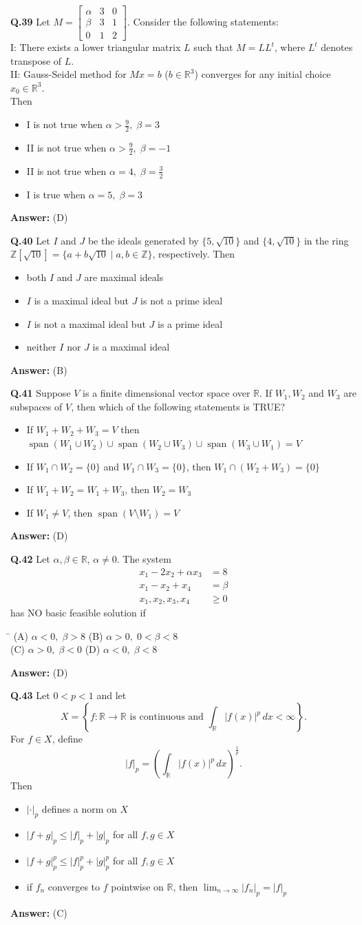 \documentclass[11pt,a4paper]{article}
\newcommand{\optsfourA}[4]{%
  \begin{tabbing}
    \hspace{0.48\linewidth}\=\kill
    (A) #1 \> (B) #2 \\[2pt]
    (C) #3 \> (D) #4
  \end{tabbing}%
}
\newcommand{\optslistA}[4]{%
  \begin{itemize}
    \setlength{\itemsep}{2pt}\setlength{\parskip}{0pt}
    \item[(A)] #1
    \item[(B)] #2
    \item[(C)] #3
    \item[(D)] #4
  \end{itemize}%
}
\newcommand{\ans}[1]{\textbf{Answer:} #1\par\medskip}
\begin{document}
\textbf{Q.39} Let $M = \begin{bmatrix} \alpha & 3 & 0 \\ \beta & 3 & 1 \\ 0 & 1 & 2 \end{bmatrix}$. Consider the following statements:\\
I: There exists a lower triangular matrix $L$ such that $M = LL^t$, where $L^t$ denotes transpose of $L$.\\
II: Gauss-Seidel method for $Mx = b$ ($b \in \mathbb{R}^3$) converges for any initial choice $x_0 \in \mathbb{R}^3$.\\
Then
\optslistA{I is not true when $\alpha > \frac{9}{2},\; \beta = 3$}{II is not true when $\alpha > \frac{9}{2},\; \beta = -1$}{II is not true when $\alpha = 4,\; \beta = \frac{3}{2}$}{I is true when $\alpha = 5,\; \beta = 3$}
\ans{(D)}

\textbf{Q.40} Let $I$ and $J$ be the ideals generated by $\{5, \sqrt{10}\}$ and $\{4, \sqrt{10}\}$ in the ring $\mathbb{Z}[\sqrt{10}] = \{a + b\sqrt{10} \mid a, b \in \mathbb{Z}\}$, respectively. Then
\optslistA{both $I$ and $J$ are maximal ideals}{$I$ is a maximal ideal but $J$ is not a prime ideal}{$I$ is not a maximal ideal but $J$ is a prime ideal}{neither $I$ nor $J$ is a maximal ideal}
\ans{(B)}

\textbf{Q.41} Suppose $V$ is a finite dimensional vector space over $\mathbb{R}$. If $W_1, W_2$ and $W_3$ are subspaces of $V$, then which of the following statements is TRUE?
\optslistA{If $W_1 + W_2 + W_3 = V$ then $\operatorname{span}(W_1 \cup W_2) \cup \operatorname{span}(W_2 \cup W_3) \cup \operatorname{span}(W_3 \cup W_1) = V$}{If $W_1 \cap W_2 = \{0\}$ and $W_1 \cap W_3 = \{0\}$, then $W_1 \cap (W_2 + W_3) = \{0\}$}{If $W_1 + W_2 = W_1 + W_3$, then $W_2 = W_3$}{If $W_1 \neq V$, then $\operatorname{span}(V \setminus W_1) = V$}
\ans{(D)}

\textbf{Q.42} Let $\alpha, \beta \in \mathbb{R}$, $\alpha \neq 0$. The system
\begin{align*}
  x_1 - 2x_2 + \alpha x_3 &= 8 \\
  x_1 - x_2 + x_4 &= \beta \\
  x_1, x_2, x_3, x_4 &\ge 0
\end{align*}
has NO basic feasible solution if
\optsfourA{$\alpha < 0,\; \beta > 8$}{$\alpha > 0,\; 0 < \beta < 8$}{$\alpha > 0,\; \beta < 0$}{$\alpha < 0,\; \beta < 8$}
\ans{(D)}

\textbf{Q.43} Let $0 < p < 1$ and let
\[
  X = \left\{f : \mathbb{R} \to \mathbb{R} \text{ is continuous and } \int_{\mathbb{R}} |f(x)|^p\,dx < \infty\right\}.
\]
For $f \in X$, define
\[
  |f|_p = \left(\int_{\mathbb{R}} |f(x)|^p\,dx\right)^{\frac{1}{p}}.
\]
Then
\optslistA{$|\cdot|_p$ defines a norm on $X$}{$|f + g|_p \le |f|_p + |g|_p$ for all $f, g \in X$}{$|f + g|_p^p \le |f|_p^p + |g|_p^p$ for all $f, g \in X$}{if $f_n$ converges to $f$ pointwise on $\mathbb{R}$, then $\lim_{n\to\infty} |f_n|_p = |f|_p$}
\ans{(C)}
\end{document}
